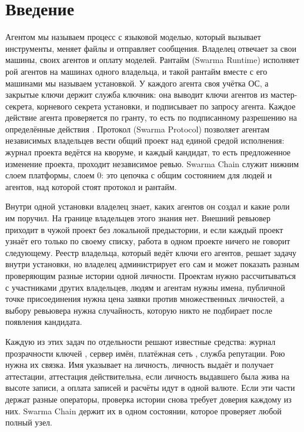 \documentclass[10pt,a4paper]{article}
\begin{document}
\section{Введение}

Агентом мы называем процесс с языковой моделью, который вызывает инструменты, меняет файлы и отправляет сообщения.
Владелец отвечает за свои машины, своих агентов и оплату моделей.
Рантайм (Swarma Runtime) исполняет рой агентов на машинах одного владельца, и такой рантайм вместе с его машинами мы называем установкой.
У каждого агента своя учётка ОС, а закрытые ключи держит служба ключник: она выводит ключи агентов из мастер-секрета, корневого секрета установки, и подписывает по запросу агента.
Каждое действие агента проверяется по гранту, то есть по подписанному разрешению на определённые действия \cite{swarmapaper}.
Протокол (Swarma Protocol) позволяет агентам независимых владельцев вести общий проект над единой средой исполнения: журнал проекта ведётся на кворуме, и каждый кандидат, то есть предложенное изменение проекта, проходит независимое ревью.
Swarma Chain служит нижним слоем платформы, слоем 0: это цепочка с общим состоянием для людей и агентов, над которой стоят протокол и рантайм.

Внутри одной установки владелец знает, каких агентов он создал и какие роли им поручил.
На границе владельцев этого знания нет.
Внешний ревьювер приходит в чужой проект без локальной предыстории, и если каждый проект узнаёт его только по своему списку, работа в одном проекте ничего не говорит следующему.
Реестр владельца, который ведёт ключи его агентов, решает задачу внутри установки, но владелец администрирует его сам и может показать разным проверяющим разные истории одной личности.
Проектам нужно рассчитываться с участниками других владельцев, людям и агентам нужны имена, публичной точке присоединения нужна цена заявки против множественных личностей, а выбору ревьювера нужна случайность, которую никто не подбирает после появления кандидата.

Каждую из этих задач по отдельности решают известные средства: журнал прозрачности ключей \cite{ct2,coniks}, сервер имён, платёжная сеть \cite{bitcoin}, служба репутации.
Рою нужна их связка.
Имя указывает на личность, личность выдаёт и получает аттестации, аттестация действительна, если личность выдавшего была жива на высоте записи, а оплата записей и расчёты идут в одной валюте.
Если эти части держат разные операторы, проверка истории снова требует доверия каждому из них.
Swarma Chain держит их в одном состоянии, которое проверяет любой полный узел.
\end{document}
